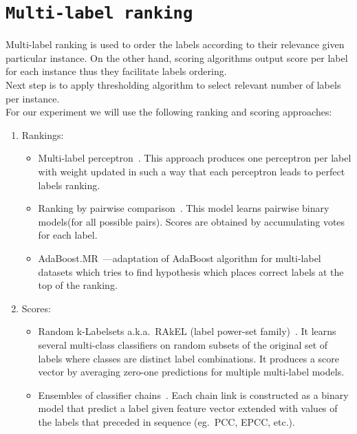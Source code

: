 \documentclass[12pt,a4paper,twocolumn]{article}
\begin{document}

\section*{\texttt{Multi-label ranking}}
Multi-label ranking is used to order the labels according to their relevance given particular instance. On the other hand, scoring algorithms output score per label for each instance thus they facilitate labels ordering.\\
Next step is to apply thresholding algorithm to select relevant number of labels per instance.\\
For our experiment we will use the following ranking and scoring approaches:

\begin{enumerate}
\item Rankings:
	\begin{itemize}
	\item Multi-label perceptron~\cite{Crammer03afamily}. This approach produces one perceptron per label with weight updated in such a way that each perceptron leads to perfect labels ranking. %
	\item Ranking by pairwise comparison~\cite{Wu:2004:PEM:1005332.1016791}. This model learns pairwise binary models(for all possible pairs). Scores are obtained by accumulating votes for each label. %
	\item AdaBoost.MR~\cite{Schapire00boostexter:a}---adaptation of AdaBoost algorithm for multi-label datasets which tries to find hypothesis which places correct labels at the top of the ranking. %
	\end{itemize}
\item Scores:
	\begin{itemize}
	\item Random k-Labelsets a.k.a.\ RAkEL (label power-set family)~\cite{Tsoumakas:2007:RKE:1421665.1421705}. It learns several multi-class classifiers on random subsets of the original set of labels where classes are distinct label combinations. It produces a score vector by averaging zero-one predictions for multiple multi-label models. %
	\item Ensembles of classifier chains~\cite{Read:2009:CCM:1617459.1617477}. Each chain link is constructed as a binary model that predict a label given feature vector extended with values of the labels that preceded in sequence (eg.\ PCC, EPCC, etc.). %
	\end{itemize}
\end{enumerate}
\end{document}
